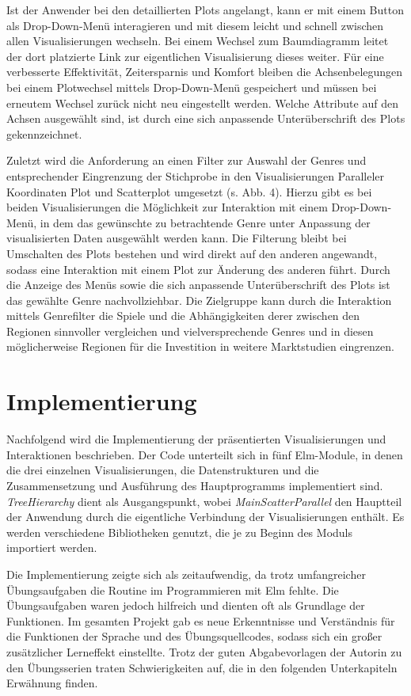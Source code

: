 \documentclass[usegeometry=true]{scrartcl}
\begin{document}
Ist der Anwender bei den detaillierten Plots angelangt, kann er mit einem Button als Drop-Down-Menü interagieren 
und mit diesem leicht und schnell zwischen allen Visualisierungen wechseln.
Bei einem Wechsel zum Baumdiagramm leitet der dort platzierte Link zur eigentlichen Visualisierung dieses weiter. 
Für eine verbesserte Effektivität, Zeitersparnis und Komfort bleiben die Achsenbelegungen bei einem Plotwechsel mittels Drop-Down-Menü gespeichert 
und müssen bei erneutem Wechsel zurück nicht neu eingestellt werden. 
Welche Attribute auf den Achsen ausgewählt sind, ist durch eine sich anpassende Unterüberschrift des Plots gekennzeichnet. 

Zuletzt wird die Anforderung an einen Filter zur Auswahl der Genres und entsprechender Eingrenzung der Stichprobe in den Visualisierungen Paralleler Koordinaten Plot und Scatterplot umgesetzt (s. Abb. 4).
Hierzu gibt es bei beiden Visualisierungen die Möglichkeit zur Interaktion mit einem Drop-Down-Menü, 
in dem das gewünschte zu betrachtende Genre unter Anpassung der visualisierten Daten ausgewählt werden kann.
Die Filterung bleibt bei Umschalten des Plots bestehen und wird direkt auf den anderen angewandt, 
sodass eine Interaktion mit einem Plot zur Änderung des anderen führt. 
Durch die Anzeige des Menüs sowie die sich anpassende Unterüberschrift des Plots ist das gewählte Genre nachvollziehbar.
Die Zielgruppe kann durch die Interaktion mittels Genrefilter die Spiele und die Abhängigkeiten derer zwischen den Regionen sinnvoller vergleichen 
und vielversprechende Genres und in diesen möglicherweise Regionen für die Investition in weitere Marktstudien eingrenzen.

\section{Implementierung}
Nachfolgend wird die Implementierung der präsentierten Visualisierungen und Interaktionen beschrieben. 
Der Code unterteilt sich in fünf Elm-Module, in denen die drei einzelnen Visualisierungen, die Datenstrukturen 
und die Zusammensetzung und Ausführung des Hauptprogramms implementiert sind. 
\textit{TreeHierarchy} dient als Ausgangspunkt, wobei \textit{MainScatterParallel} den Hauptteil der Anwendung durch die eigentliche Verbindung 
der Visualisierungen enthält.
Es werden verschiedene Bibliotheken genutzt, die je zu Beginn des Moduls importiert werden.
           
Die Implementierung zeigte sich als zeitaufwendig, da trotz umfangreicher Übungsaufgaben die Routine im Programmieren mit Elm fehlte.
Die Übungsaufgaben waren jedoch hilfreich und dienten oft als Grundlage der Funktionen.
Im gesamten Projekt gab es neue Erkenntnisse und Verständnis für die Funktionen der Sprache und des Übungsquellcodes, 
sodass sich ein großer zusätzlicher Lerneffekt einstellte.
Trotz der guten Abgabevorlagen der Autorin zu den Übungsserien traten Schwierigkeiten auf, 
die in den folgenden Unterkapiteln Erwähnung finden.
          
\end{document}
